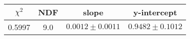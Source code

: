 \begin{tabular}{|c|c|c|c|}

\hline
$\chi^{2}$ & NDF & slope & y-intercept  \\
\hline
0.5997 & 9.0 & $0.0012\pm0.0011$ & $0.9482\pm0.1012$ \\
\hline

\end{tabular}